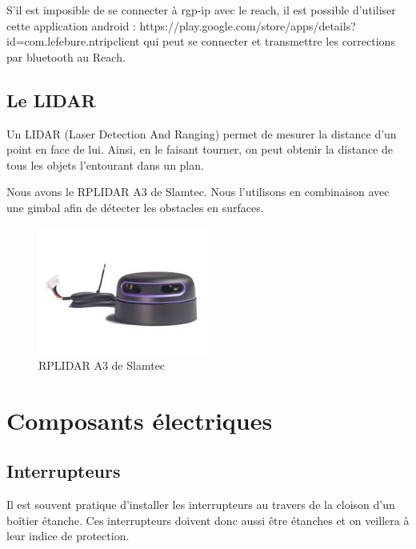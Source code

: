 \documentclass[a4paper, 11pt]{report}
\begin{document}
S'il est imposible de se connecter à rgp-ip avec le reach, il est possible d'utiliser cette application android : https://play.google.com/store/apps/details?id=com.lefebure.ntripclient qui peut se connecter et transmettre les corrections par bluetooth au Reach.

\section{Le LIDAR}
Un LIDAR  (Laser Detection And Ranging) permet de mesurer la distance d'un point en face de lui. Ainsi, en le faisant tourner, on peut obtenir la distance de tous les objets l'entourant dans un plan. 

Nous avons le RPLIDAR A3 de Slamtec. Nous l'utilisons en combinaison avec une gimbal afin de détecter les obstacles en surfaces.

\begin{figure}[h]
	\begin{center}
		\includegraphics[width=0.5\textwidth]{images/LIDAR.jpg}
		\caption{RPLIDAR A3 de Slamtec}
	\end{center}
\end{figure}

\chapter{Composants électriques}

\section{Interrupteurs}

Il est souvent pratique d'installer les interrupteurs au travers de
la cloison d'un boîtier étanche. Ces interrupteurs doivent donc aussi
être étanches et on veillera à leur indice de protection.
\end{document}
